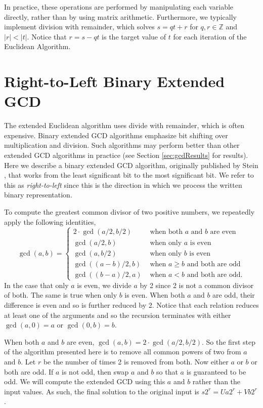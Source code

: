 \documentclass{ucalgthes1}
\theoremstyle{definition}
\newcommand{\ZZ}{\mathbb{Z}}
\begin{document}
In practice, these operations are performed by manipulating each variable directly, rather than by using matrix arithmetic.  Furthermore, we typically implement division with remainder, which solves $s = qt + r$ for $q,r \in \ZZ$ and $|r| < |t|$.  Notice that $r = s - qt$ is the target value of $t$ for each iteration of the Euclidean Algorithm.


\section{Right-to-Left Binary Extended GCD}
\label{sec:gcdR2LBin}

The extended Euclidean algorithm uses divide with remainder, which is often expensive.  Binary extended GCD algorithms emphasize bit shifting over multiplication and division.  Such algorithms may perform better than other extended GCD algorithms in practice (see Section \ref{sec:gcdResults} for results).  Here we describe a binary extended GCD algorithm, originally published by Stein \cite{Stein1967}, that works from the least significant bit to the most significant bit.  We refer to this as \emph{right-to-left} since this is the direction in which we process the written binary representation.

To compute the greatest common divisor of two positive numbers, we repeatedly apply the following identities,
\[
	\gcd(a, b) = \begin{cases}
		2 \cdot \gcd(a/2, b/2) & \textrm{ when both $a$ and $b$ are even} \\
		\gcd(a/2, b) & \textrm{ when only $a$ is even} \\
		\gcd(a, b/2) & \textrm{ when only $b$ is even} \\
		\gcd((a-b)/2, b) & \textrm{ when $a \ge b$ and both are odd} \\
		\gcd((b-a)/2, a) & \textrm{ when $a < b$ and both are odd}.
	\end{cases}
\]
In the case that only $a$ is even, we divide $a$ by 2 since 2 is not a common divisor of both.  The same is true when only $b$ is even.  When both $a$ and $b$ are odd, their difference is even and so is further reduced by 2.  Notice that each relation reduces at least one of the arguments and so the recursion terminates with either $\gcd(a, 0) = a$ or $\gcd(0, b) = b$.

When both $a$ and $b$ are even, $\gcd(a, b) = 2 \cdot \gcd(a/2, b/2)$.  So the first step of the algorithm presented here is to remove all common powers of two from $a$ and $b$.  Let $r$ be the number of times 2 is removed from both.  Now either $a$ or $b$ or both are odd.  If $a$ is not odd, then swap $a$ and $b$ so that $a$ is guaranteed to be odd.  We will compute the extended GCD using this $a$ and $b$ rather than the input values.  As such, the final solution to the original input is $s2^r = Ua2^r + Vb2^r$.
\end{document}

